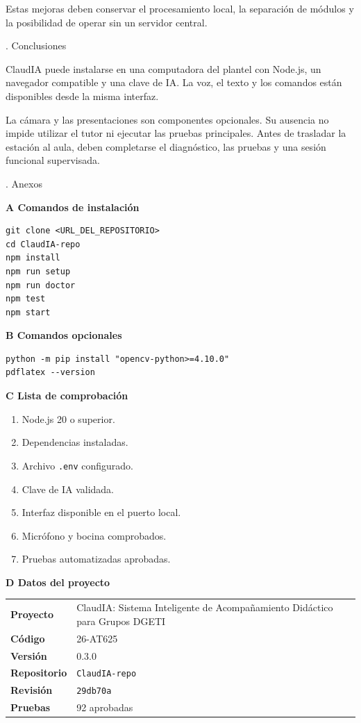 \documentclass[11pt]{article}
\newcommand{\SectionNum}[2]{%
  \par\phantomsection\label{sec:#1}%
  {\normalfont\fontsize{14}{17}\selectfont #1. #2\par}%
  \vspace{7pt}%
}
\newcommand{\SubsectionNum}[2]{%
  \par\vspace{4pt}%
  {\normalfont\fontsize{12}{16.7}\selectfont\bfseries #1 #2\par}%
  \vspace{3pt}%
}
\begin{document}
Estas mejoras deben conservar el procesamiento local, la separación de módulos y la posibilidad de operar sin un servidor central.

\SectionNum{16}{Conclusiones}
ClaudIA puede instalarse en una computadora del plantel con Node.js, un navegador compatible y una clave de IA. La voz, el texto y los comandos están disponibles desde la misma interfaz.

La cámara y las presentaciones son componentes opcionales. Su ausencia no impide utilizar el tutor ni ejecutar las pruebas principales. Antes de trasladar la estación al aula, deben completarse el diagnóstico, las pruebas y una sesión funcional supervisada.

\clearpage
\SectionNum{17}{Anexos}
\SubsectionNum{A}{Comandos de instalación}
\begin{lstlisting}
git clone <URL_DEL_REPOSITORIO>
cd ClaudIA-repo
npm install
npm run setup
npm run doctor
npm test
npm start
\end{lstlisting}

\SubsectionNum{B}{Comandos opcionales}
\begin{lstlisting}
python -m pip install "opencv-python>=4.10.0"
pdflatex --version
\end{lstlisting}

\SubsectionNum{C}{Lista de comprobación}
\begin{enumerate}
  \item Node.js 20 o superior.
  \item Dependencias instaladas.
  \item Archivo \texttt{.env} configurado.
  \item Clave de IA validada.
  \item Interfaz disponible en el puerto local.
  \item Micrófono y bocina comprobados.
  \item Pruebas automatizadas aprobadas.
\end{enumerate}

\SubsectionNum{D}{Datos del proyecto}
\begin{center}
\begin{tabularx}{\textwidth}{@{}>{\bfseries}p{1.45in}X@{}}
\toprule
Proyecto & ClaudIA: Sistema Inteligente de Acompañamiento Didáctico para Grupos DGETI \\
Código & 26-AT625 \\
Versión & 0.3.0 \\
Repositorio & \texttt{ClaudIA-repo} \\
Revisión & \texttt{29db70a} \\
Pruebas & 92 aprobadas \\
\bottomrule
\end{tabularx}
\end{center}
\end{document}
